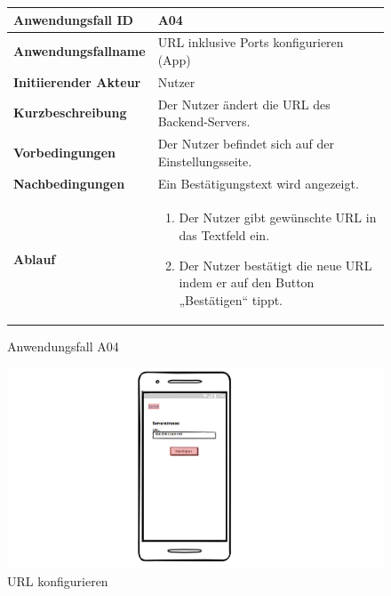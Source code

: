 \begin{figure}[h]
	\centering
	\begin{tabularx}{\textwidth}{ X | X }
		\textbf{Anwendungsfall ID} & A04 \\ \hline
		\textbf{Anwendungsfallname} & URL inklusive Ports konfigurieren (App) \\ \hline
		\textbf{Initiierender Akteur} & Nutzer \\ \hline
		\textbf{Kurzbeschreibung} & Der Nutzer ändert die URL des Backend-Servers.  \\ \hline
		\textbf{Vorbedingungen} & Der Nutzer befindet sich auf der Einstellungsseite.  \\ \hline
		\textbf{Nachbedingungen} & Ein Bestätigungstext wird angezeigt.  \\ \hline
		\textbf{Ablauf} &
			\begin{enumerate}
				\item Der Nutzer gibt gewünschte URL in das Textfeld ein.
				\item Der Nutzer bestätigt die neue URL indem er auf den Button „Bestätigen“ tippt.
			\end{enumerate} \\ \hline
	\end{tabularx}
	\caption{Anwendungsfall A04}
	\label{fig:anwendungsfall-app-tabelle-xx-1}
\end{figure}

\begin{figure}[h]
	\centering
	\includegraphics[width=\textwidth]{img/MUurl.png}			
	\caption{URL konfigurieren}
	\label{fig:anwendungsfalldiagramm-app}
\end{figure}


